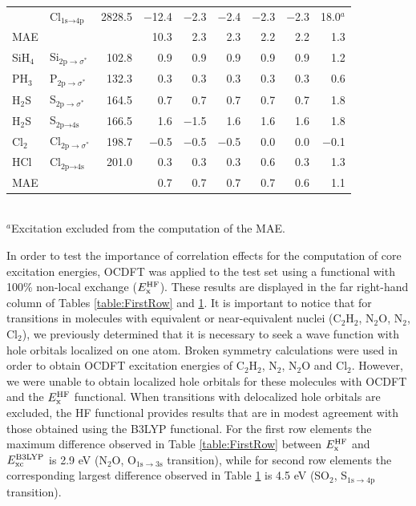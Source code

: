 \documentclass{article}
\begin{document}
\begin{table}[t!]
\begin{tabular}{llrrrrrrr}
& Cl$_{\text{1s}\rightarrow\text{4p}}$ & 2828.5 & $-$12.4 & $-$2.3 & $-$2.4 & $-$2.3 & $-$2.3 & 18.0$^{a}$ \\[3pt]
MAE  & & &  10.3 & 2.3 & 2.3 & 2.2 & 2.2 & 1.3\\
\midrule
SiH$_4$ & Si$_{\text{2p}\rightarrow\sigma^*}$ & 102.8 & 0.9 & 0.9 & 0.9 & 0.9 & 0.9 & 1.2 \\
PH$_3$ & P$_{\text{2p}\rightarrow\sigma^*}$ & 132.3 & 0.3 & 0.3 & 0.3 & 0.3 & 0.3 & 0.6 \\
H$_2$S & S$_{\text{2p}\rightarrow\sigma^*}$ & 164.5 & 0.7 & 0.7 & 0.7 & 0.7 & 0.7 & 1.8 \\
H$_2$S & S$_{\text{2p}\rightarrow\text{4s}}$ & 166.5 & 1.6 & $-$1.5 & 1.6 & 1.6 & 1.6 & 1.8 \\
Cl$_2$ & Cl$_{\text{2p}\rightarrow\sigma^*}$ & 198.7 & $-$0.5 & $-$0.5 & $-$0.5 & 0.0 & 0.0 & $-$0.1 \\
HCl & Cl$_{\text{2p}\rightarrow\text{4s}}$ & 201.0 & 0.3 & 0.3 & 0.3 & 0.6 & 0.3 & 1.3 \\[3 pt]
MAE & & & 0.7 & 0.7& 0.7 & 0.7 & 0.6 & 1.1 \\
\bottomrule
\end{tabular}\\
$^{a}$Excitation excluded from the computation of the MAE.
\label{table:SecondRow}
\end{table} 

In order to test the importance of correlation effects for the computation of core excitation energies, OCDFT was applied to the test set using a functional with 100\% non-local exchange ($E^{\text{HF}}_{\rm x}$). These results are displayed in the far right-hand column of Tables \ref{table:FirstRow} and \ref{table:SecondRow}.
It is important to notice that for transitions in molecules with equivalent or near-equivalent nuclei (C$_2$H$_2$, N$_2$O, N$_2$, Cl$_2$), we previously determined that it is necessary to seek a wave function with hole orbitals localized on one atom.\cite{Wallace-OCDFT} Broken symmetry calculations were used in order to obtain OCDFT excitation energies of C$_2$H$_2$, N$_2$, N$_2$O and Cl$_2$. However, we were unable to obtain localized hole orbitals for these molecules with OCDFT and the $E^{\text{HF}}_{\rm x}$ functional.
When transitions with delocalized hole orbitals are excluded, the HF functional provides results that are in modest agreement with those obtained using the B3LYP functional. For the first row elements the maximum difference observed in Table \ref{table:FirstRow} between $E^{\text{HF}}_{\rm x}$ and $E^{\text{B3LYP}}_{\rm xc}$ is 2.9 eV (N$_2$O, O$_{1\text{s} \rightarrow 3\text{s}}$ transition), while for second row elements the corresponding largest difference observed in Table \ref{table:SecondRow} is 4.5 eV (SO$_2$, S$_{1\text{s} \rightarrow 4\text{p}}$ transition).
\end{document}

